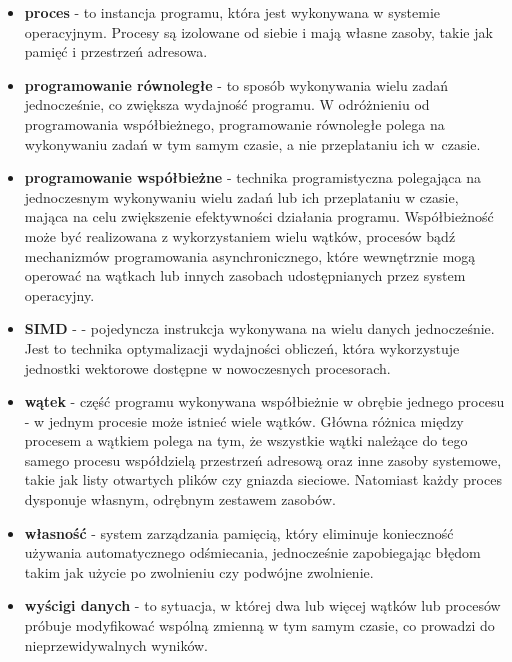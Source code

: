 \begin{itemize}
    \item \textbf{proces} - to instancja programu, która jest wykonywana w systemie operacyjnym. Procesy są izolowane od siebie i mają własne zasoby, takie jak pamięć i przestrzeń adresowa.

    \item \textbf{programowanie równoległe} - to sposób wykonywania wielu zadań jednocześnie, co zwiększa wydajność programu. W odróżnieniu od programowania współbieżnego, programowanie równoległe polega na wykonywaniu zadań w tym samym czasie, a nie przeplataniu ich w~czasie.

    \item \textbf{programowanie współbieżne} - technika programistyczna polegająca na jednoczesnym wykonywaniu wielu zadań lub ich przeplataniu w czasie, mająca na celu zwiększenie efektywności działania programu. Współbieżność może być realizowana z wykorzystaniem wielu wątków, procesów bądź mechanizmów programowania asynchronicznego, które wewnętrznie mogą operować na wątkach lub innych zasobach udostępnianych przez system operacyjny.

    \item \textbf{SIMD} -  - pojedyncza instrukcja wykonywana na wielu danych jednocześnie. Jest to technika optymalizacji wydajności obliczeń, która wykorzystuje jednostki wektorowe dostępne w nowoczesnych procesorach.

    \item \textbf{wątek} - część programu wykonywana współbieżnie w obrębie jednego procesu - w jednym procesie może istnieć wiele wątków. Główna różnica między procesem a wątkiem polega na tym, że wszystkie wątki należące do tego samego procesu współdzielą przestrzeń adresową oraz inne zasoby systemowe, takie jak listy otwartych plików czy gniazda sieciowe. Natomiast każdy proces dysponuje własnym, odrębnym zestawem zasobów.

    \item \textbf{własność}  - system zarządzania pamięcią, który eliminuje konieczność używania automatycznego odśmiecania, jednocześnie zapobiegając błędom takim jak użycie po zwolnieniu czy podwójne zwolnienie.

    \item \textbf{wyścigi danych}  - to sytuacja, w której dwa lub więcej wątków lub procesów próbuje modyfikować wspólną zmienną w tym samym czasie, co prowadzi do nieprzewidywalnych wyników.
\end{itemize}

